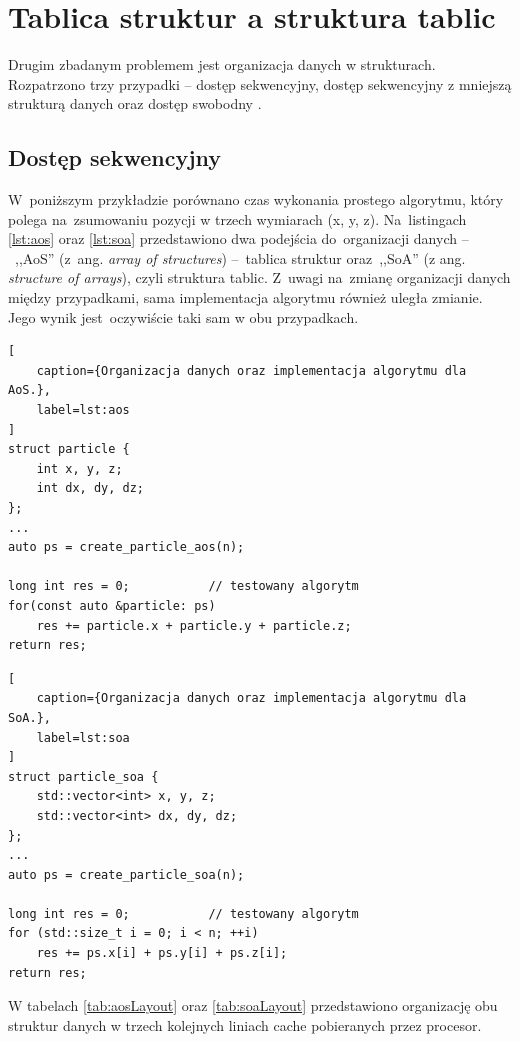 \clearpage %
\section{Tablica struktur a struktura tablic}

Drugim zbadanym problemem jest organizacja danych w strukturach. Rozpatrzono trzy przypadki -- dostęp sekwencyjny, dostęp sekwencyjny z mniejszą strukturą danych oraz dostęp swobodny \cite{MindTheCache_AoSVsSoa, MindTheCache_CompactAoSVsSoa, MindTheCache_RandomAoSVsSoa}.

\subsection{Dostęp sekwencyjny}
\label{sub:aosVsSoaSequential}

W~poniższym przykładzie porównano czas wykonania prostego algorytmu, który polega na~zsumowaniu pozycji w trzech wymiarach (x, y, z). Na~listingach \ref{lst:aos} oraz \ref{lst:soa} przedstawiono dwa podejścia do~organizacji danych --~,,AoS'' (z~ang. \textit{array of structures}) --~tablica struktur oraz~,,SoA'' (z ang. \textit{structure of arrays}), czyli struktura tablic. Z~uwagi na~zmianę organizacji danych między przypadkami, sama implementacja algorytmu również uległa zmianie. Jego wynik jest~oczywiście taki sam w obu przypadkach.

\begin{lstlisting}[
    caption={Organizacja danych oraz implementacja algorytmu dla AoS.},
    label=lst:aos
]
struct particle {
    int x, y, z;
    int dx, dy, dz;
};
...
auto ps = create_particle_aos(n);

long int res = 0;			// testowany algorytm
for(const auto &particle: ps)
    res += particle.x + particle.y + particle.z;
return res;
\end{lstlisting}


\begin{lstlisting}[
    caption={Organizacja danych oraz implementacja algorytmu dla SoA.},
    label=lst:soa
]
struct particle_soa {
    std::vector<int> x, y, z;
    std::vector<int> dx, dy, dz;
};
...
auto ps = create_particle_soa(n);

long int res = 0;			// testowany algorytm
for (std::size_t i = 0; i < n; ++i)
    res += ps.x[i] + ps.y[i] + ps.z[i];
return res;
\end{lstlisting}

W tabelach \ref{tab:aosLayout} oraz \ref{tab:soaLayout} przedstawiono organizację obu struktur danych w trzech kolejnych liniach cache pobieranych przez procesor.


